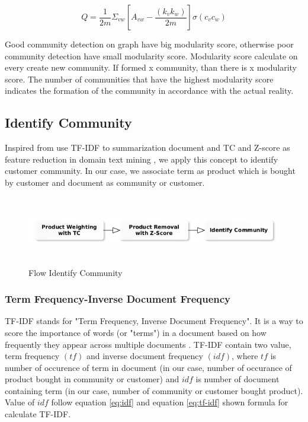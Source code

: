 \documentclass[conference]{IEEEtran}
\begin{document}
\begin{equation}
	\label{eq:modularity_GN}
    Q = \frac{1}{2m} \Sigma_{vw} [A_{vw} - \frac{(k_{v}k_{w})}{2m}] \sigma(c_{v}c_{w})
\end{equation}

Good community detection on graph have big modularity score, otherwise poor community detection have small modularity score. Modularity score calculate on every create new community. If formed x community, than there is x modularity score. The number of communities that have the highest modularity score indicates the formation of the community in accordance with the actual reality.
\subsection{Identify Community}
Inspired from use TF-IDF to summarization document and TC and Z-score as feature reduction in domain text mining \cite{Munggaran}, we apply this concept to identify customer community. In our case, we associate term as product which is bought by customer and document as community or customer.

\begin{figure}[h]
\centering
\includegraphics[width=\columnwidth, height=3cm,keepaspectratio]{figure/identify_community}
\caption{Flow Identify Community}
\label{bidirectional_edge}
\end{figure}

\subsubsection{Term Frequency-Inverse Document Frequency}
TF-IDF stands for "Term Frequency, Inverse Document Frequency". It is a way to score the importance of words (or "terms") in a document based on how frequently they appear across multiple documents \cite{Lan}. TF-IDF contain two value, term frequency \((tf)\) and inverse document frequency \((idf)\), where \(tf\) is number of occurence of term in document (in our case, number of occurance of product bought in community or customer) and \(idf\) is number of document containing term (in our case, number of community or customer bought product). Value of \(idf\) follow equation \ref{eq:idf} and equation \ref{eq:tf-idf} shown formula for calculate TF-IDF.
\end{document}
